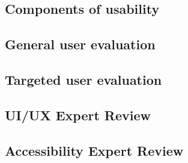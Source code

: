 \documentclass[preview]{standalone}
\begin{document}
\subsection{Components of usability}


\subsection{General user evaluation}


\newpage
\subsection{Targeted user evaluation}


\newpage
\subsection{UI/UX Expert Review}


\subsection{Accessibility Expert Review}

\end{document}
